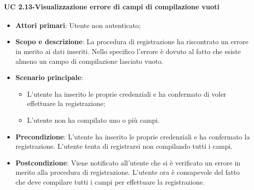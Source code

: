             \paragraph{UC 2.13-Visualizzazione errore di campi di compilazione vuoti}
            \begin{itemize}
                \item \textbf{Attori primari}: Utente non autenticato;
                
                \item \textbf{Scopo e descrizione}: La procedura di registrazione ha riscontrato un errore in merito ai
                dati inseriti. Nello specifico l'errore è dovuto al fatto che esiste almeno un campo di compilazione lasciato vuoto.
                  
                \item \textbf{Scenario principale}: 
                    \begin{itemize}
                        \item L'utente ha inserito le proprie credenziali e ha confermato di voler effettuare la registrazione;
                        \item L'utente non ha compilato uno o più campi.
                    \end{itemize}
                \item \textbf{Precondizione}: L'utente ha inserito le proprie credenziali e ha confermato la registrazione. L'utente tenta di registrarsi non compilando tutti i campi.
                 \item \textbf{Postcondizione}: Viene notificato all'utente che si è verificato un errore in merito
                alla procedura di registrazione. L'utente ora è consapevole del fatto che deve compilare tutti i campi per effettuare la registrazione.
            \end{itemize}
        

